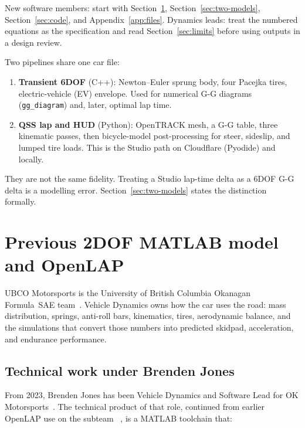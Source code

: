 \documentclass[11pt,letterpaper]{article}
\begin{document}
New software members: start with Section~\ref{sec:lineage},
Section~\ref{sec:two-models}, Section~\ref{sec:code}, and
Appendix~\ref{app:files}. Dynamics leads: treat the numbered equations
as the specification and read Section~\ref{sec:limits} before using
outputs in a design review.

Two pipelines share one car file:

\begin{enumerate}[leftmargin=1.6em]
  \item \textbf{Transient 6DOF} (C++): Newton--Euler sprung body, four
        Pacejka tires, electric-vehicle (EV) envelope. Used for
        numerical G-G diagrams (\texttt{gg\_diagram}) and, later,
        optimal lap time.
  \item \textbf{QSS lap and HUD} (Python): OpenTRACK mesh, a G-G table,
        three kinematic passes, then bicycle-model post-processing for
        steer, sideslip, and lumped tire loads. This is the Studio path
        on Cloudflare (Pyodide) and locally.
\end{enumerate}

They are not the same fidelity. Treating a Studio lap-time delta as a
6DOF G-G delta is a modelling error. Section~\ref{sec:two-models}
states the distinction formally.

\section{Previous 2DOF MATLAB model and OpenLAP}
\label{sec:lineage}

UBCO Motorsports is the University of British Columbia Okanagan
Formula~SAE team~\cite{okmotorsports}. Vehicle Dynamics owns how the car
uses the road: mass distribution, springs, anti-roll bars, kinematics,
tires, aerodynamic balance, and the simulations that convert those
numbers into predicted skidpad, acceleration, and endurance performance.

\subsection{Technical work under Brenden Jones}
\label{sec:jones}

From 2023, Brenden Jones has been Vehicle Dynamics and Software Lead
for OK Motorsports~\cite{jones-linkedin}. The technical product of that
role, continued from earlier OpenLAP use on the subteam
~\cite{lopesbandy-linkedin}, is a MATLAB toolchain that:
\end{document}
